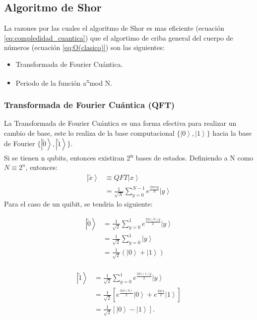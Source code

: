 \subsection{Algoritmo de Shor}
La razones por las cuales el algoritmo de Shor es mas eficiente (ecuación \ref{eq:compledidad_cuantica}) que el algortimo de criba general del cuerpo de números (ecuación \ref{eq:O(clasico)}) son las siguientes:
\begin{itemize}
    \item Transformada de Fourier Cuántica.
    \item Periodo de la función a\textsuperscript{x}mod N.
\end{itemize}
\subsubsection{Transformada de Fourier Cuántica (QFT)}
La Transformada de Fourier Cuántica es una forma efectiva para realizar un cambio de base, este lo realiza de la base computacional $\lbrace \left|0 \right\rangle,\left|1 \right\rangle \rbrace$ hacia 
la base de Fourier $\lbrace \left| \tilde{0} \right\rangle,\left| \tilde{1} \right\rangle \rbrace$.\\
Si se tienen n qubits, entonces existiran 2\textsuperscript{n} bases de estados. Definiendo a N como $N\equiv 2^n$, entonces:
\begin{align*}
    \left|\tilde{x} \right\rangle &\equiv QFT\left| x \right\rangle\\
    &= \frac{1}{\sqrt{N}} \sum\limits_{y=0}^{N-1} e^{\frac{2\pi i x y}{N}} \left|y \right\rangle
\end{align*}
Para el caso de un quibit, se tendria lo siguiente:\\
\begin{minipage}{0.5\linewidth}
    \begin{align*}
        \left|\tilde{0} \right\rangle &= \frac{1}{\sqrt{2}} \sum\limits_{y=0}^1 e^{\frac{2\pi i (0)y}{2}} \left|y \right\rangle \\
        &= \frac{1}{\sqrt{2}} \sum\limits_{y=0}^1 \left|y \right\rangle \\
        &= \frac{1}{\sqrt{2}} \left(\left| 0\right\rangle + \left| 1\right\rangle \right) \\
    \end{align*}  
\end{minipage}
\begin{minipage}{0.5\linewidth}
    \begin{align*}
        \left| \tilde{1} \right\rangle & = \frac{1}{\sqrt{2}} \sum\limits_{y=0}^1 e^{\frac{2\pi i (1)y}{2}} \left|y \right\rangle \\
        &= \frac{1}{\sqrt{2}} \left[e^{\frac{2\pi i(0)}{2}}\left| 0\right\rangle+ e^{\frac{2  \pi i 1}{2}} \left|1 \right\rangle\right] \\
        &= \frac{1}{\sqrt{2}} \left[\left|0 \right\rangle-\left|1 \right\rangle \right].\\
    \end{align*}
\end{minipage}
